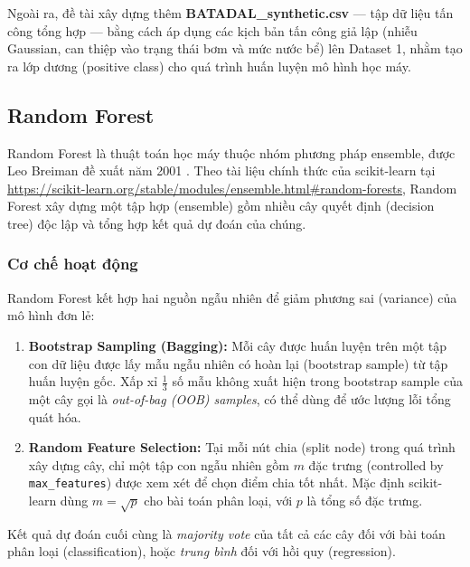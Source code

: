 Ngoài ra, đề tài xây dựng thêm \textbf{BATADAL\_synthetic.csv} --- tập dữ liệu
tấn công tổng hợp --- bằng cách áp dụng các kịch bản tấn công giả lập
(nhiễu Gaussian, can thiệp vào trạng thái bơm và mức nước bể) lên Dataset 1, nhằm
tạo ra lớp dương (positive class) cho quá trình huấn luyện mô hình học máy.

\subsection{Random Forest}

Random Forest là thuật toán học máy thuộc nhóm phương pháp ensemble, được Leo
Breiman đề xuất năm 2001 \cite{breiman2001random}. Theo tài liệu chính thức của
scikit-learn tại
\url{https://scikit-learn.org/stable/modules/ensemble.html\#random-forests},
Random Forest xây dựng một tập hợp (ensemble) gồm nhiều cây quyết định (decision
tree) độc lập và tổng hợp kết quả dự đoán của chúng.

\subsubsection{Cơ chế hoạt động}

Random Forest kết hợp hai nguồn ngẫu nhiên để giảm phương sai (variance) của mô
hình đơn lẻ:

\begin{enumerate}[label=\arabic*.]
  \item \textbf{Bootstrap Sampling (Bagging):} Mỗi cây được huấn luyện trên một
    tập con dữ liệu được lấy mẫu ngẫu nhiên có hoàn lại (bootstrap sample) từ
    tập huấn luyện gốc. Xấp xỉ $\frac{1}{3}$ số mẫu không xuất hiện trong
    bootstrap sample của một cây gọi là \emph{out-of-bag (OOB) samples}, có thể
    dùng để ước lượng lỗi tổng quát hóa.
  \item \textbf{Random Feature Selection:} Tại mỗi nút chia (split node) trong
    quá trình xây dựng cây, chỉ một tập con ngẫu nhiên gồm $m$ đặc trưng
    (controlled by \texttt{max\_features}) được xem xét để chọn điểm chia tốt nhất.
    Mặc định scikit-learn dùng $m = \sqrt{p}$ cho bài toán phân loại, với $p$ là
    tổng số đặc trưng.
\end{enumerate}

Kết quả dự đoán cuối cùng là \emph{majority vote} của tất cả các cây đối với bài
toán phân loại (classification), hoặc \emph{trung bình} đối với hồi quy
(regression).

